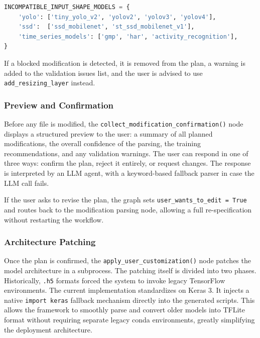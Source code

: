 \begin{lstlisting}[language=Python, caption={Input shape compatibility guard}, label={lst:input_guard}]
INCOMPATIBLE_INPUT_SHAPE_MODELS = {
    'yolo': ['tiny_yolo_v2', 'yolov2', 'yolov3', 'yolov4'],
    'ssd':  ['ssd_mobilenet', 'st_ssd_mobilenet_v1'],
    'time_series_models': ['gmp', 'har', 'activity_recognition'],
}
\end{lstlisting}

If a blocked modification is detected, it is removed from the plan, a warning is added to the validation issues list, and the user is advised to use \texttt{add\_\allowbreak resizing\_\allowbreak layer} instead.

\subsubsection{Preview and Confirmation}

Before any file is modified, the \texttt{collect\_\allowbreak modification\_\allowbreak confirmation()} node displays a structured preview to the user: a summary of all planned modifications, the overall confidence of the parsing, the training recommendations, and any validation warnings. The user can respond in one of three ways: confirm the plan, reject it entirely, or request changes. The response is interpreted by an LLM agent, with a keyword-based fallback parser in case the LLM call fails.

If the user asks to revise the plan, the graph sets \texttt{user\_\allowbreak wants\_\allowbreak to\_\allowbreak edit = True} and routes back to the modification parsing node, allowing a full re-specification without restarting the workflow.

\subsubsection{Architecture Patching}
\label{sec:arch_patching}

Once the plan is confirmed, the \texttt{apply\_\allowbreak user\_\allowbreak customization()} node patches the model architecture in a subprocess. The patching itself is divided into two phases. Historically, \texttt{.h5} formats forced the system to invoke legacy TensorFlow environments. The current implementation standardizes on Keras 3. It injects a native \texttt{import keras} fallback mechanism directly into the generated scripts. This allows the framework to smoothly parse and convert older models into TFLite format without requiring separate legacy conda environments, greatly simplifying the deployment architecture.

